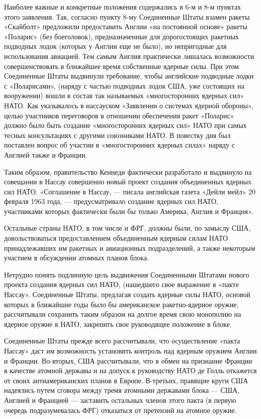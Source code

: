 \documentclass[12pt, a4paper, openany]{book}
\begin{document}
Наиболее важные и конкретные положения содержались в 6-м и 8-м пунктах этого заявления. Так, согласно пункту 8-му Соединенные Штаты взамен ракеты «Скайболт» предложили предоставить Англии «на постоянной основе» ракеты «Поларис» (без боеголовок), предназначенные для дорогостоящих ракетных подводных лодок (которых у Англии еще не было), но непригодные для использования авиацией. Тем самым Англия практически лишалась возможности совершенствовать в ближайшее время собственные ядерные силы. При этом Соединенные Штаты выдвинули требование, чтобы английские подводные лодки с «Поларисами», (наряду с частью подводных лодок США, уже состоящих на вооружении) вошли в состав так называемых «многосторонних ядерных сил» НАТО. Как указывалось в нассауском «Заявлении о системах ядерной обороны», целью участников переговоров в отношении обеспечения ракет «Поларис» должно было быть создание «многосторонних ядерных сил» НАТО при самых тесных консультациях с другими союзниками НАТО. В повестку дня был поставлен вопрос об участии в «многосторонних ядерных силах» наряду с Англией также и Франции.
	
Таким образом, правительство Кеннеди фактически разработало и выдвинуло на совещании в Нассау совершенно новый проект создания объединенных ядерных сил НАТО. «Соглашение в Нассау, — писала английская газета «Дейли мейл» 20 февраля 1963 года, — предусматривало создание ядерных сил НАТО, участниками которых фактически были бы только Америка, Англия и Франция».
	
Остальные страны НАТО, в том числе и ФРГ, должны были, по замыслу США, довольствоваться предоставлением объединенным ядерным силам НАТО принадлежавших им ракетных и авиационных подразделений, а также некоторым участием в обсуждении атомных планов блока.
	
Нетрудно понять подлинную цель выдвижения Соединенными Штатами нового проекта создания ядерных сил НАТО, (нашедшего свое выражение в «пакте Нассау». Соединенные Штаты, предлагая создать ядерные силы НАТО, основой которых в ближайшие годы было бы американское ракетно-ядерное оружие, рассчитывали сохранить таким образом на долгое время свою монополию на ядерное оружие в НАТО, закрепить свое руководящее положение в блоке.
	
Соединенные Штаты прежде всего рассчитывали, что осуществление «пакта Нассау» даст им возможность установить контроль над ядерным оружием Англии и Франции. Во-вторых, США рассчитывали, что в обмен на признание Франции в качестве атомной державы и на допуск к руководству НАТО де Голль откажется от своих антиамериканских планов в Европе. В-третьих, правящие круги США надеялись путем сговора между тремя атомными державами блока — США, Англией и Францией — заставить остальных членов этого пакта (в первую очередь подразумевалась ФРГ) отказаться от претензий на атомное оружие.
	
\end{document}
